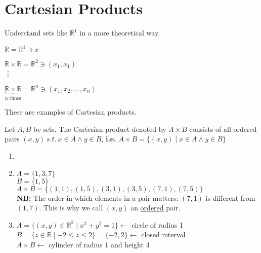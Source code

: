 \documentclass[10pt]{article}
\begin{document}
	\section{Cartesian Products}
	\begin{description}
		\item[Task:] Understand sets like $\mathbb{R}^1$ in a more theoretical way.
		\item[Recall from Calculus:]
		\item $\mathbb{R} = \mathbb{R}^1 \ni x$
		\item $\mathbb{R} \times \mathbb{R} = \mathbb{R}^2 \ni (x_1, x_1)$ \\ \vdots
		\item $\underbrace{\mathbb{R} \times \mathbb{R}}_{\text{n times}} = \mathbb{R}^n \ni (x_1, x_2, ..., x_n)$
		\item These are examples of Cartesian products.
		\item[Definition:] Let $A, B$ be sets. The Cartesian product denoted by $A \times B$ consists of all ordered pairs $(x, y) \: s.t. \: x \in A \land y \in B$, \textbf{i.e.} $A \times B = \{(x, y) \mid x \in A \land y \in B \}$
		\item[Further Examples:]
		\begin{enumerate}
			\item[]
			\item $A = \{1, 3, 7\}$ \\
			$B = \{1, 5\}$ \\
			$A \times B = \{(1, 1), (1, 5), (3, 1), (3, 5), (7, 1), (7, 5)\}$ \\
			\textbf{NB:} The order in which elements in a pair matters: $(7, 1)$ is different from $(1, 7)$. This is why we call $(x, y)$ an \underline{ordered} pair.
			\item $A = \{(x, y) \in \mathbb{R}^2 \mid x^2 + y^2 = 1 \} \leftarrow$ circle of radius 1 \\
			$B = \{z \in \mathbb{R} \mid -2 \leq z \leq 2 \} = \{-2, 2\} \leftarrow$ closed interval \\
			$A \times B \leftarrow$ cylinder of radius 1 and height 4
		\end{enumerate}
	\end{description}
	
\end{document}
